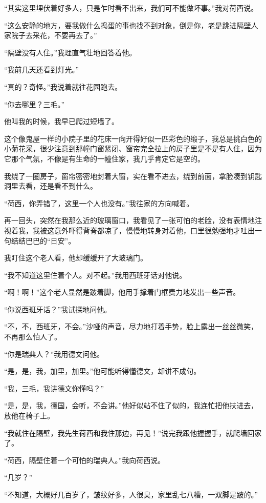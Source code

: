 \par “其实这里埋伏着好多人，只是乍时看不出来，我们可不能做坏事。”我对荷西说。
\par “这么安静的地方，要我做什么捣蛋的事也找不到对象，倒是你，老是跳进隔壁人家院子去采花，不要再去了。”
\par “隔壁没有人住。”我理直气壮地回答着他。
\par “我前几天还看到灯光。”
\par “真的？奇怪。”我说着就往花园跑去。
\par “你去哪里？三毛。”
\par 他叫我的时候，我早已爬过短墙了。
\par 这个像鬼屋一样的小院子里的花床一向开得好似一匹彩色的缎子，我总是挑白色的小菊花采，很少注意到那幢门窗紧闭、窗帘完全拉上的房子里是不是有人住，因为它那个气氛，不像是有生命的一幢住家，我几乎肯定它是空的。
\par 我绕了一圈房子，窗帘密密地封着大窗，实在看不进去，绕到前面，拿脸凑到钥匙洞里去看，还是看不到什么。
\par “荷西，你弄错了，这里一个人也没有。”我往家的方向喊着。
\par 再一回头，突然在我那么近的玻璃窗口，我看见了一张可怕的老脸，没有表情地注视着我，我被这意外吓得背脊都凉了，慢慢地转身对着他，口里很勉强地才吐出一句结结巴巴的“日安”。
\par 我盯住这个老人看，他却缓缓开了大玻璃门。
\par “我不知道这里住着个人。对不起。”我用西班牙话对他说。
\par “啊！啊！”这个老人显然是跛着脚，他用手撑着门框费力地发出一些声音。
\par “你说西班牙话？”我试探地问他。
\par “不，不，西班牙，不会。”沙哑的声音，尽力地打着手势，脸上露出一丝丝微笑，不再那么怕人了。
\par “你是瑞典人？”我用德文问他。
\par “是，是，我，加里，加里。”他可能听得懂德文，却讲不成句。
\par “我，三毛，我讲德文你懂吗？”
\par “是，是，我，德国，会听，不会讲。”他好似站不住了似的，我连忙把他扶进去，放他在椅子上。
\par “我就住在隔壁，我先生荷西和我住那边，再见！”说完我跟他握握手，就爬墙回家了。
\par “荷西，隔壁住着一个可怕的瑞典人。”我向荷西说。
\par “几岁？”
\par “不知道，大概好几百岁了，皱纹好多，人很臭，家里乱七八糟，一双脚是跛的。”

